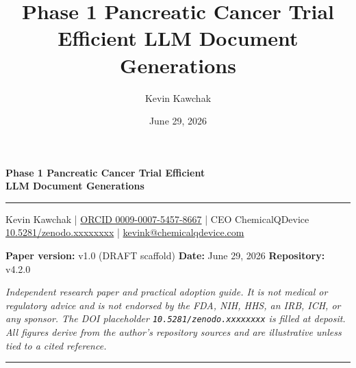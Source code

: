 \documentclass[11pt]{article}
\title{Phase 1 Pancreatic Cancer Trial Efficient LLM Document Generations}
\author{Kevin Kawchak}
\date{June 29, 2026}
\begin{document}
\thispagestyle{plain}

\begin{center}
{\LARGE\bfseries Phase 1 Pancreatic Cancer Trial Efficient\\LLM Document Generations}\\[0.5em]
{\color{paperblack}\rule{\linewidth}{1.2pt}}
\end{center}

\begin{center}\small
Kevin Kawchak \;|\; \href{https://orcid.org/0009-0007-5457-8667}{ORCID 0009-0007-5457-8667} \;|\;
CEO ChemicalQDevice \\
\href{https://doi.org/10.5281/zenodo.xxxxxxxx}{10.5281/zenodo.xxxxxxxx} \;|\;
\href{mailto:kevink@chemicalqdevice.com}{kevink@chemicalqdevice.com}
\end{center}

\begin{center}\footnotesize
\textbf{Paper version:} v1.0 (DRAFT scaffold) \quad
\textbf{Date:} June 29, 2026 \quad
\textbf{Repository:} v4.2.0
\end{center}

\noindent\footnotesize\textit{Independent research paper and practical adoption
guide. It is not medical or regulatory advice and is not endorsed by the FDA, NIH,
HHS, an IRB, ICH, or any sponsor. The DOI placeholder
\texttt{10.5281/zenodo.xxxxxxxx} is filled at deposit. All figures derive from the
author's repository sources and are illustrative unless tied to a cited
reference.}\normalsize\par

\vspace{0.4em}
{\color{paperblack}\rule{\linewidth}{0.6pt}}





\renewcommand{\contentsname}{Table of Contents}
{\setlength{\parskip}{0pt}\small\tableofcontents}







\end{document}

